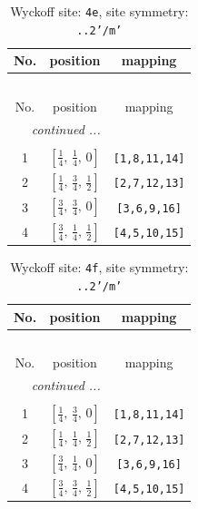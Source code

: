 \documentclass[fleqn,8pt]{jsarticle}
\begin{document}
\renewcommand{\arraystretch}{1.2}
\begin{longtable}{ccc}
\caption{Wyckoff site: {\tt 4e}, site symmetry: {\tt ..2'/m'}}
 \\
 \hline \hline
No. & position & mapping \\ \hline \endfirsthead

\multicolumn{2}{l}{\tablename\ \thetable{}} \\
 \hline \hline
No. & position & mapping \\ \hline \endhead

 \hline \hline
\multicolumn{2}{r}{\footnotesize\it continued ...} \\ \endfoot

 \hline \hline
\multicolumn{2}{r}{} \\ \endlastfoot

1 & $\left[ \frac{1}{4},\, \frac{1}{4},\, 0 \right]$ & {\tt [1,8,11,14]} \\ \hline
2 & $\left[ \frac{1}{4},\, \frac{3}{4},\, \frac{1}{2} \right]$ & {\tt [2,7,12,13]} \\ \hline
3 & $\left[ \frac{3}{4},\, \frac{3}{4},\, 0 \right]$ & {\tt [3,6,9,16]} \\ \hline
4 & $\left[ \frac{3}{4},\, \frac{1}{4},\, \frac{1}{2} \right]$ & {\tt [4,5,10,15]} \\
\end{longtable}
\renewcommand{\arraystretch}{1.2}
\begin{longtable}{ccc}
\caption{Wyckoff site: {\tt 4f}, site symmetry: {\tt ..2'/m'}}
 \\
 \hline \hline
No. & position & mapping \\ \hline \endfirsthead

\multicolumn{2}{l}{\tablename\ \thetable{}} \\
 \hline \hline
No. & position & mapping \\ \hline \endhead

 \hline \hline
\multicolumn{2}{r}{\footnotesize\it continued ...} \\ \endfoot

 \hline \hline
\multicolumn{2}{r}{} \\ \endlastfoot

1 & $\left[ \frac{1}{4},\, \frac{3}{4},\, 0 \right]$ & {\tt [1,8,11,14]} \\ \hline
2 & $\left[ \frac{1}{4},\, \frac{1}{4},\, \frac{1}{2} \right]$ & {\tt [2,7,12,13]} \\ \hline
3 & $\left[ \frac{3}{4},\, \frac{1}{4},\, 0 \right]$ & {\tt [3,6,9,16]} \\ \hline
4 & $\left[ \frac{3}{4},\, \frac{3}{4},\, \frac{1}{2} \right]$ & {\tt [4,5,10,15]} \\
\end{longtable}
\end{document}
